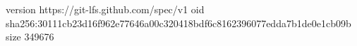 version https://git-lfs.github.com/spec/v1
oid sha256:30111cb23d16f962e77646a00c320418bdf6c8162396077edda7b1de0e1cb09b
size 349676
